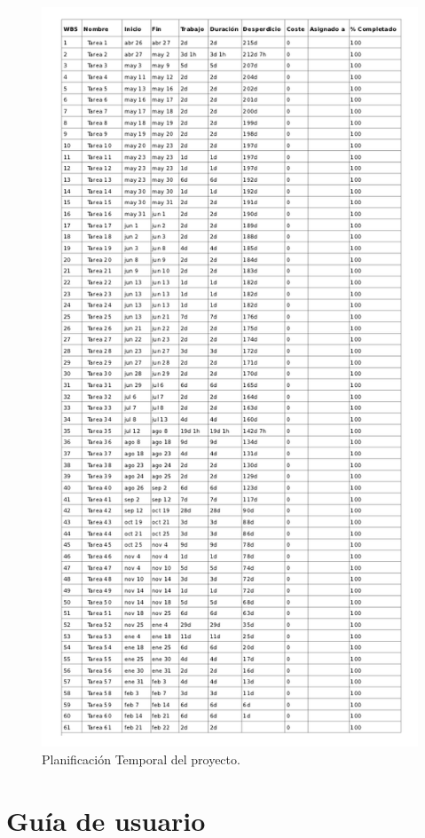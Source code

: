 \documentclass[a4paper,12pt]{article}
\begin{document}
\pagebreak
\begin{figure}[H]
\begin{center}
\includegraphics[width=11.5cm]{planificacion_graphvisualx_8.png}
\caption{Planificación Temporal del proyecto.}
\end{center}
\end{figure}


\section{Guía de usuario}
\end{document}
